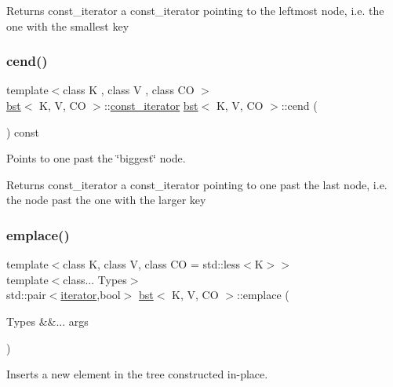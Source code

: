 \begin{DoxyReturn}{Returns}
const\+\_\+iterator a const\+\_\+iterator pointing to the leftmost node, i.\+e. the one with the smallest key 
\end{DoxyReturn}
\mbox{\label{classbst_a42dd418f5e482a92208ff577e6b85989}} 
\subsubsection{\texorpdfstring{cend()}{cend()}}
{\footnotesize\ttfamily template$<$class K , class V , class CO $>$ \\
\hyperlink{classbst}{bst}$<$ K, V, CO $>$\+::\hyperlink{classbst_1_1__iterator}{const\+\_\+iterator} \hyperlink{classbst}{bst}$<$ K, V, CO $>$\+::cend (\begin{DoxyParamCaption}{ }\end{DoxyParamCaption}) const\hspace{0.3cm}{\ttfamily [noexcept]}}



Points to one past the \char`\"{}biggest\char`\"{} node. 

\begin{DoxyReturn}{Returns}
const\+\_\+iterator a const\+\_\+iterator pointing to one past the last node, i.\+e. the node past the one with the larger key 
\end{DoxyReturn}
\mbox{\label{classbst_a39905be360bebca6156dacc16b5d0485}} 
\subsubsection{\texorpdfstring{emplace()}{emplace()}}
{\footnotesize\ttfamily template$<$class K, class V, class CO = std\+::less$<$\+K$>$$>$ \\
template$<$class... Types$>$ \\
std\+::pair$<$\hyperlink{classbst_a9378fa7f3f48ee62f3a0b4d168d8d98b}{iterator},bool$>$ \hyperlink{classbst}{bst}$<$ K, V, CO $>$\+::emplace (\begin{DoxyParamCaption}\item[{Types \&\&...}]{args }\end{DoxyParamCaption})}



Inserts a new element in the tree constructed in-\/place. 


